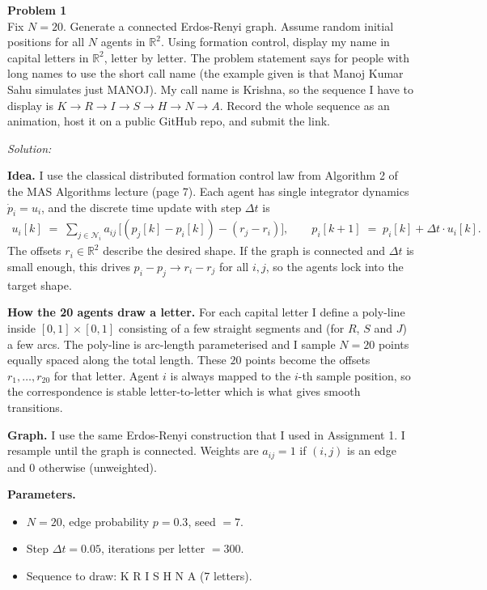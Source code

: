 \documentclass[a4paper, 11pt]{article}
\newenvironment{problem}[2][Problem]
    { \begin{mdframed}[backgroundcolor=gray!20] \textbf{#1 #2} \\}
    {  \end{mdframed}}
\newenvironment{solution}
    {\textit{Solution:}}
    {}
\begin{document}
\begin{problem}{1}
Fix $N = 20$. Generate a connected Erdos-Renyi graph. Assume random initial positions for all $N$ agents in $\mathbb{R}^2$. Using formation control, display my name in capital letters in $\mathbb{R}^2$, letter by letter. The problem statement says for people with long names to use the short call name (the example given is that Manoj Kumar Sahu simulates just MANOJ). My call name is Krishna, so the sequence I have to display is $K \to R \to I \to S \to H \to N \to A$. Record the whole sequence as an animation, host it on a public GitHub repo, and submit the link.
\end{problem}
\begin{solution}

\textbf{Idea.} I use the classical distributed formation control law from Algorithm 2 of the MAS Algorithms lecture (page 7). Each agent has single integrator dynamics $\dot p_i = u_i$, and the discrete time update with step $\Delta t$ is
\begin{align*}
    u_i[k] \;=\; \sum_{j \in \mathcal{N}_i} a_{ij}\, \big[ (p_j[k] - p_i[k]) - (r_j - r_i) \big], \qquad p_i[k+1] \;=\; p_i[k] + \Delta t \cdot u_i[k].
\end{align*}
The offsets $r_i \in \mathbb{R}^2$ describe the desired shape. If the graph is connected and $\Delta t$ is small enough, this drives $p_i - p_j \to r_i - r_j$ for all $i, j$, so the agents lock into the target shape.

\textbf{How the 20 agents draw a letter.} For each capital letter I define a poly-line inside $[0,1]\times [0,1]$ consisting of a few straight segments and (for $R$, $S$ and $J$) a few arcs. The poly-line is arc-length parameterised and I sample $N = 20$ points equally spaced along the total length. These $20$ points become the offsets $r_1, \ldots, r_{20}$ for that letter. Agent $i$ is always mapped to the $i$-th sample position, so the correspondence is stable letter-to-letter which is what gives smooth transitions.

\textbf{Graph.} I use the same Erdos-Renyi construction that I used in Assignment 1. I resample until the graph is connected. Weights are $a_{ij} = 1$ if $(i,j)$ is an edge and $0$ otherwise (unweighted).

\textbf{Parameters.}
\begin{itemize}[nosep]
    \item $N = 20$, edge probability $p = 0.3$, seed $=7$.
    \item Step $\Delta t = 0.05$, iterations per letter $= 300$.
    \item Sequence to draw: K R I S H N A (7 letters).
\end{itemize}


\end{solution}
\end{document}
